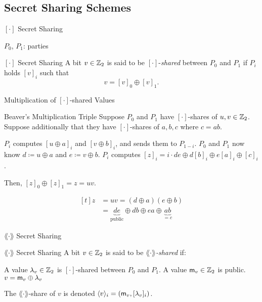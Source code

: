 \documentclass[../250326_cryptlab_flute_security.tex]{subfiles}
\begin{document}
\subsection{Secret Sharing Schemes}
\begin{frame}{\([\cdot]\) Secret Sharing}
    \centerline{\(P_0\), \(P_1\): parties}
    \begin{block}{\([\cdot]\) Secret Sharing}
        A bit \(v \in \mathbb{Z}_2\) is said to be \([\cdot]\)-\emph{shared}
        between \(P_0\) and \(P_1\) if \(P_i\) holds \([v]_i\) such that
        \[v = [v]_0 \oplus [v]_1.\]
    \end{block}
\end{frame}

\begin{frame}{Multiplication of \([\cdot]\)-shared Values}
    \begin{block}{Beaver's Multiplication Triple}
        Suppose \(P_0\) and \(P_1\) have \([\cdot]\)-shares of \(u, v \in \mathbb{Z}_2\).
        Suppose additionally that they have \([\cdot]\)-shares of \(a, b, c\) where \(c = ab\).
        \begin{enumerate}
            \ii
            \(P_i\) computes \([u \oplus a]_i\) and \([v \oplus b]_i\),
            and sends them to \(P_{1-i}\).
            \ii
            \(P_0\) and \(P_1\) now know \(d \coloneqq u \oplus a\) and \(e \coloneqq v \oplus b\).
            \ii
            \(P_i\) computes \([z]_i = i \cdot de \oplus d[b]_i \oplus e[a]_i \oplus [c]_i\).
        \end{enumerate}
        Then, \([z]_0 \oplus [z]_1 = z = uv\).
    \end{block}

    \begin{exampleblock}{}
        \[\begin{aligned}[t]
            z &= uv = (d \oplus a)(e \oplus b) \\
              &= {\underbrace{de}_\text{public}} \oplus db \oplus ea \oplus \underbrace{ab}_{=c}
        \end{aligned}\]
    \end{exampleblock}
\end{frame}

\begin{frame}{\(\lang \cdot \rang\) Secret Sharing}
    \begin{block}{\(\lang\cdot\rang\) Secret Sharing}
        A bit \(v \in \mathbb{Z}_2\) is said to be \(\lang\cdot\rang\)\emph{-shared} if:
        \begin{enumerate}
            \ii
            A value \(\lambda_v \in \mathbb{Z}_2\) is \([\cdot]\)-shared between \(P_0\) and \(P_1\).
            \ii
            A value \(\mathsf{m}_v \in \mathbb{Z}_2\) is public.
            \ii
            \(v = \mathsf{m}_v \oplus \lambda_v\)
        \end{enumerate}

        The \(\lang \cdot \rang\)-share of \(v\) is denoted
        \(\langle v \rangle_i = (\mathsf{m}_v, [\lambda_v]_i)\).
    \end{block}
\end{frame}
\end{document}
